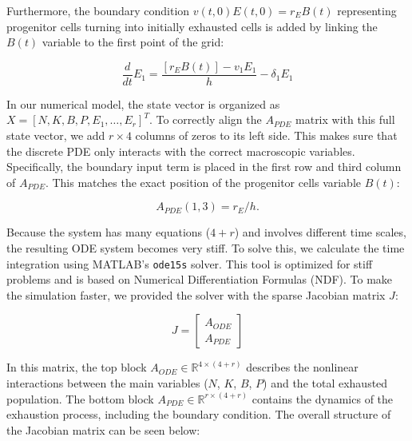 \documentclass[12pt,a4paper]{article}
\begin{document}
Furthermore, the boundary condition $v(t,0)E(t,0)=r_EB(t)$ representing progenitor cells turning into initially exhausted cells is added by linking the $B(t)$ variable to the first point of the grid:

\begin{equation}
    \frac{d}{dt}E_1 = \frac{\left[r_EB(t)\right] - v_1E_1}{h} - \delta_1E_1
\end{equation}

In our numerical model, the state vector is organized as $X = [N, K, B, P, E_1, \dots, E_r]^T$. To correctly align the $A_{PDE}$ matrix with this full state vector, we add $r \times 4$ columns of zeros to its left side. This makes sure that the discrete PDE only interacts with the correct macroscopic variables. Specifically, the boundary input term is placed in the first row and third column of $A_{PDE}$. This matches the exact position of the progenitor cells variable $B(t)$:

\begin{equation}
     A_{PDE}(1, 3) = r_E/h.
\end{equation}

Because the system has many equations ($4 + r$) and involves different time scales, the resulting ODE system becomes very stiff. To solve this, we calculate the time integration using MATLAB's \texttt{ode15s} solver. This tool is optimized for stiff problems and is based on Numerical Differentiation Formulas (NDF). To make the simulation faster, we provided the solver with the sparse Jacobian matrix $J$:

\begin{equation}
    J = \begin{bmatrix}
        A_{ODE} \\
        A_{PDE}
    \end{bmatrix}
\end{equation}

In this matrix, the top block $A_{ODE} \in \mathbb{R}^{4 \times (4+r)}$ describes the nonlinear interactions between the main variables ($N$, $K$, $B$, $P$) and the total exhausted population. The bottom block $A_{PDE} \in \mathbb{R}^{r \times (4+r)}$ contains the dynamics of the exhaustion process, including the boundary condition. The overall structure of the Jacobian matrix can be seen below:
\end{document}
